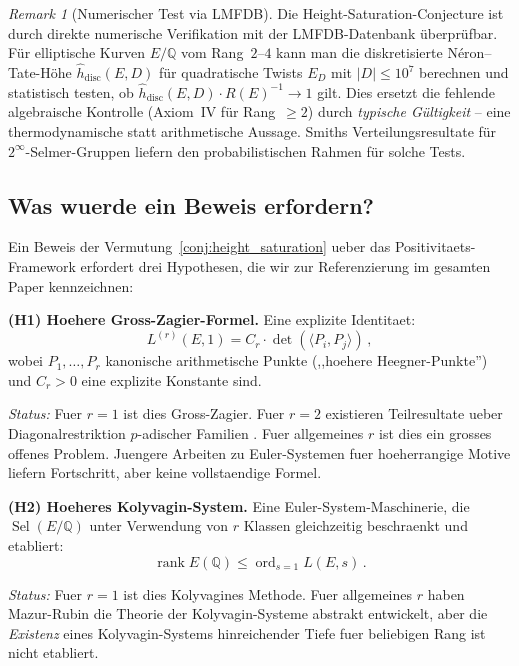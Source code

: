 \documentclass[aps,prd,twocolumn,superscriptaddress,nofootinbib]{revtex4-2}
\theoremstyle{definition}
\theoremstyle{remark}
\newtheorem{remark}[theorem]{Remark}
\DeclareMathOperator{\ord}{ord}
\DeclareMathOperator{\rank}{rank}
\DeclareMathOperator{\Sel}{Sel}
\begin{document}
\begin{remark}[Numerischer Test via LMFDB]\label{rem:lmfdb-saturation}
Die Height-Saturation-Conjecture ist durch direkte numerische Verifikation mit der LMFDB-Datenbank \"uberpr\"ufbar. F\"ur elliptische Kurven $E/\mathbb{Q}$ vom Rang~$2$--$4$ kann man die diskretisierte N\'eron--Tate-H\"ohe $\hat{h}_{\mathrm{disc}}(E,D)$ f\"ur quadratische Twists $E_D$ mit $|D| \leq 10^7$ berechnen und statistisch testen, ob $\hat{h}_{\mathrm{disc}}(E,D) \cdot R(E)^{-1} \to 1$ gilt. Dies ersetzt die fehlende algebraische Kontrolle (Axiom~IV f\"ur Rang~$\geq 2$) durch \emph{typische G\"ultigkeit} -- eine thermodynamische statt arithmetische Aussage. Smiths Verteilungsresultate f\"ur $2^\infty$-Selmer-Gruppen \cite{Smith2022} liefern den probabilistischen Rahmen f\"ur solche Tests.
\end{remark}

\subsection{Was wuerde ein Beweis erfordern?}

Ein Beweis der Vermutung~\ref{conj:height_saturation} ueber das Positivitaets-Framework erfordert drei Hypothesen, die wir zur Referenzierung im gesamten Paper kennzeichnen:

\textbf{(H1) Hoehere Gross-Zagier-Formel.} Eine explizite Identitaet:
\begin{equation}
L^{(r)}(E,1) = C_r \cdot \det\!\left(\langle P_i, P_j \rangle\right)\,,
\label{eq:higher_gz}
\end{equation}
wobei $P_1, \ldots, P_r$ kanonische arithmetische Punkte (,,hoehere Heegner-Punkte'') und $C_r > 0$ eine explizite Konstante sind.

\textit{Status:} Fuer $r = 1$ ist dies Gross-Zagier. Fuer $r = 2$ existieren Teilresultate ueber Diagonalrestriktion $p$-adischer Familien \cite{DarmonRotger2017}. Fuer allgemeines $r$ ist dies ein grosses offenes Problem. Juengere Arbeiten zu Euler-Systemen fuer hoeherrangige Motive \cite{LSZ2020} liefern Fortschritt, aber keine vollstaendige Formel.

\textbf{(H2) Hoeheres Kolyvagin-System.} Eine Euler-System-Maschinerie, die $\Sel(E/\mathbb{Q})$ unter Verwendung von $r$ Klassen gleichzeitig beschraenkt und etabliert:
\begin{equation}
\rank E(\mathbb{Q}) \leq \ord_{s=1} L(E,s)\,.
\end{equation}

\textit{Status:} Fuer $r = 1$ ist dies Kolyvagines Methode. Fuer allgemeines $r$ haben Mazur-Rubin \cite{MazurRubin2004} die Theorie der Kolyvagin-Systeme abstrakt entwickelt, aber die \textit{Existenz} eines Kolyvagin-Systems hinreichender Tiefe fuer beliebigen Rang ist nicht etabliert.
\end{document}
